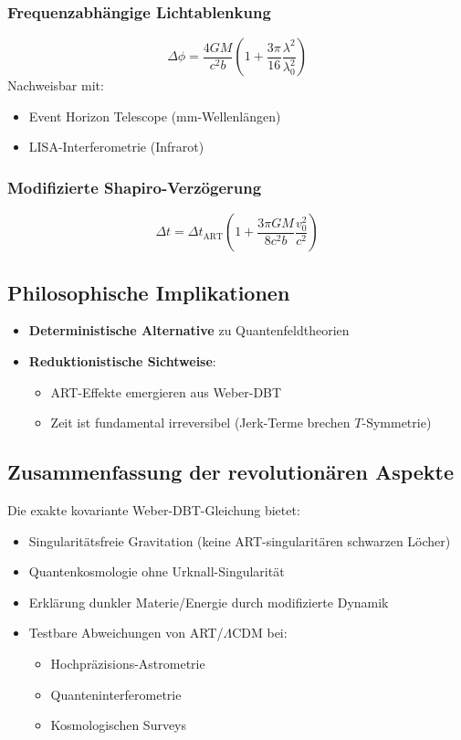 \subsubsection{Frequenzabhängige Lichtablenkung}
\begin{equation}
\Delta\phi = \frac{4GM}{c^2b}\left(1 + \frac{3\pi}{16}\frac{\lambda^2}{\lambda_0^2}\right)
\end{equation}
Nachweisbar mit:
\begin{itemize}
\item Event Horizon Telescope (mm-Wellenlängen)
\item LISA-Interferometrie (Infrarot)
\end{itemize}

\subsubsection{Modifizierte Shapiro-Verzögerung}
\begin{equation}
\Delta t = \Delta t_{\mathrm{ART}} \left(1 + \frac{3\pi GM}{8c^2b}\frac{v_0^2}{c^2}\right)
\end{equation}

\subsection{Philosophische Implikationen}
\begin{itemize}
\item \textbf{Deterministische Alternative} zu Quantenfeldtheorien
\item \textbf{Reduktionistische Sichtweise}:
\begin{itemize}
\item ART-Effekte emergieren aus Weber-DBT
\item Zeit ist fundamental irreversibel (Jerk-Terme brechen $T$-Symmetrie)
\end{itemize}
\end{itemize}

\subsection{Zusammenfassung der revolutionären Aspekte}
\begin{boxed}
Die exakte kovariante Weber-DBT-Gleichung bietet:
\begin{itemize}
\item Singularitätsfreie Gravitation (keine ART-singularitären schwarzen Löcher)
\item Quantenkosmologie ohne Urknall-Singularität
\item Erklärung dunkler Materie/Energie durch modifizierte Dynamik
\item Testbare Abweichungen von ART/$\Lambda$CDM bei:
\begin{itemize}
\item Hochpräzisions-Astrometrie
\item Quanteninterferometrie
\item Kosmologischen Surveys
\end{itemize}
\end{itemize}
\end{boxed}

